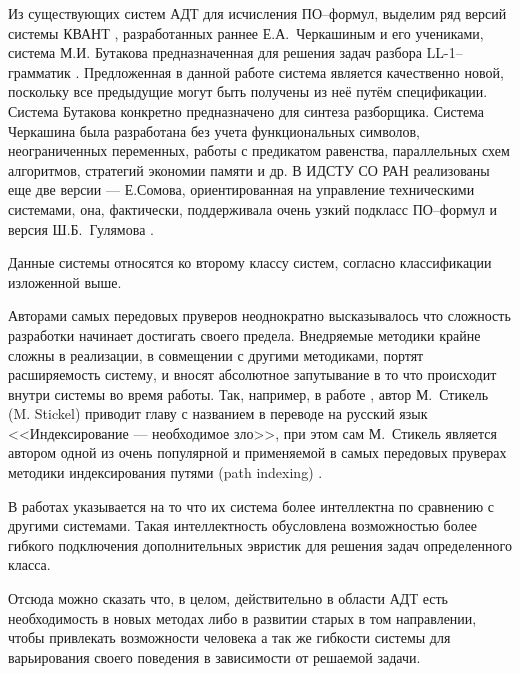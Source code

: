 
Из существующих систем АДТ для исчисления ПО--формул, выделим ряд версий системы КВАНТ \cite{dissChe, Che2, QUANT4}, разработанных раннее Е.А.~Черкашиным и его учениками, система М.И. Бутакова предназначенная для решения задач разбора LL-1--грамматик \cite{Butakov1}. Предложенная в данной работе система является качественно новой, поскольку все предыдущие могут быть получены из неё путём спецификации. Система Бутакова конкретно предназначено для синтеза разборщика. Система Черкашина была разработана без учета функциональных символов, неограниченных переменных, работы с предикатом равенства, параллельных схем алгоритмов, стратегий экономии памяти и др. В ИДСТУ СО РАН реализованы еще две версии --- Е.Сомова, ориентированная на управление техническими системами, она, фактически, поддерживала очень узкий подкласс ПО--формул и версия Ш.Б.~Гулямова \cite{Gulamov}.

Данные системы относятся ко второму классу систем, согласно классификации изложенной выше.

Авторами самых передовых пруверов неоднократно высказывалось что сложность разработки начинает достигать своего предела. Внедряемые методики крайне сложны в реализации, в совмещении с другими методиками, портят расширяемость систему, и вносят абсолютное запутывание в то что происходит внутри системы во время работы. Так, например, в работе \cite{BTPStickel}, автор М.~Стикель (M. Stickel) приводит главу с названием в переводе на русский язык <<Индексирование --- необходимое зло>>, при этом сам М.~Стикель является автором одной из очень популярной и применяемой в самых передовых пруверах методики индексирования путями (path indexing) \cite{pathindex}.

В работах \cite{Eprover} указывается на то что их система более интеллектна по сравнению с другими системами. Такая интеллектность обусловлена возможностью более гибкого подключения дополнительных эвристик для решения задач определенного класса.

Отсюда можно сказать что, в целом, действительно в области АДТ есть необходимость в новых методах либо в развитии старых в том направлении, чтобы привлекать возможности человека а так же гибкости системы для варьирования своего поведения в зависимости от решаемой задачи.


